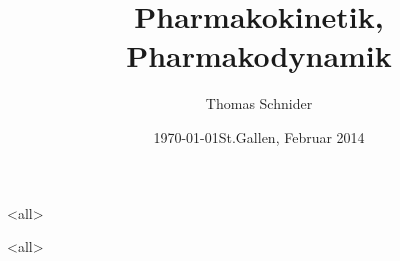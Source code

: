 \documentclass[12pt,xcolor=dvipsname,ignorenonframetext,handout%
]{beamer}
\author{Thomas Schnider}
\date{\today}
\title{Pharmakokinetik, Pharmakodynamik}
\subtitle{}
\author{}
\institute[Kantonsspital St.Gallen] {
  \inst{}
 }
\date[02.2014]{St.Gallen, Februar 2014}
\begin{document}
\mode<all>

\mode<all>

\end{document}
